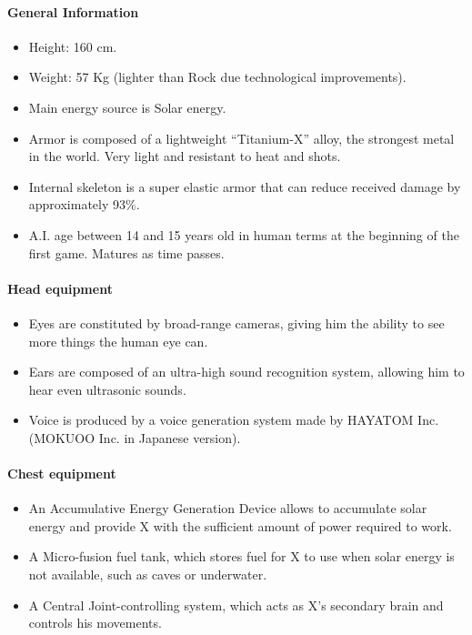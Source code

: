 \paragraph{General Information}
\begin{itemize}
	\item Height: 160 cm.
	\item Weight: 57 Kg (lighter than Rock due technological improvements).
	\item Main energy source is Solar energy.
	\item Armor is composed of a lightweight ``Titanium-X'' alloy, the strongest metal in the world. Very light and resistant to heat and shots.
	\item Internal skeleton is a super elastic armor that can reduce received damage by approximately 93\%.
	\item A.I. age between 14 and 15 years old in human terms at the beginning of the first game. Matures as time passes.
\end{itemize}

\paragraph{Head equipment}
\begin{itemize}
	\item Eyes are constituted by broad-range cameras, giving him the ability to see more things the human eye can.
	\item Ears are composed of an ultra-high sound recognition system, allowing him to hear even ultrasonic sounds.
	\item Voice is produced by a voice generation system made by HAYATOM Inc. (MOKUOO Inc. in Japanese version). 
\end{itemize}

\paragraph{Chest equipment}
\begin{itemize}
	\item An Accumulative Energy Generation Device allows to accumulate solar energy and provide X with the sufficient amount of power required to work.
	\item A Micro-fusion fuel tank, which stores fuel for X to use when solar energy is not available, such as caves or underwater.
	\item A Central Joint-controlling system, which acts as X's secondary brain and controls his movements.
\end{itemize}

